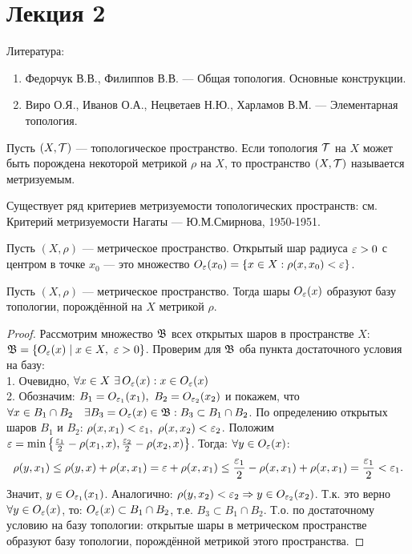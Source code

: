 \section{Лекция 2}

Литература:
\begin{enumerate}
    \item Федорчук В.В., Филиппов В.В. --- Общая топология. Основные конструкции.
    \item Виро О.Я., Иванов О.А., Нецветаев Н.Ю., Харламов В.М. --- Элементарная топология.
\end{enumerate}

\begin{definition}
    Пусть $(X, \mathcal{T})$ --- топологическое пространство. Если топология $\mathcal{T}$ на $X$ может быть порождена некоторой метрикой $\rho$ на $X$, то пространство $(X, \mathcal{T})$ называется метризуемым.
\end{definition}

\begin{nota_bene}
    Существует ряд критериев метризуемости топологических пространств: см. Критерий метризуемости Нагаты --- Ю.М.Смирнова, 1950-1951.
\end{nota_bene}

\begin{definition}
    Пусть $(X, \rho)$ --- метрическое пространство. Открытый шар радиуса $\varepsilon > 0$ с центром в точке $x_0$ --- это множество $O_{\varepsilon}(x_0) = \left\{x \in X : \rho(x, x_0) < \varepsilon\right\}$.
\end{definition}

\begin{theorem}
    Пусть $(X, \rho)$ --- метрическое пространство. Тогда шары $O_{\varepsilon}(x)$ образуют базу топологии, порождённой на $X$ метрикой $\rho$.
\end{theorem}
\begin{proof}
    Рассмотрим множество $\mathfrak{B}$ всех открытых шаров в пространстве $X$: \quad $\mfB = \cbr{O_{\veps}(x) \mid x \in X, \ \veps > 0}$. Проверим для $\mathfrak{B}$ оба пункта достаточного условия на базу: \\
    1. Очевидно, $\forall x \in X \ \exists \, O_{\varepsilon}(x) : x \in O_{\varepsilon}(x)$ \\
    2. Обозначим: $B_1 = O_{\varepsilon_1}(x_1), \ B_2 = O_{\varepsilon_2}(x_2)$ и покажем, что $\forall x \in B_1 \cap B_2 \quad \exists B_3 = O_{\varepsilon}(x) \in \mathfrak{B}: B_3 \subset B_1 \cap B_2$. По определению открытых шаров $B_1$ и $B_2$:
    $\rho(x, x_1) < \varepsilon_1, \ \rho(x, x_2) < \varepsilon_2$. Положим $\varepsilon = \min\left\{\frac{\varepsilon_1}{2} - \rho(x_1, x), \frac{\varepsilon_2}{2} - \rho(x_2, x)\right\}$. Тогда: $\forall y \in O_{\varepsilon}(x)$:
    \[
        \rho(y, x_1) \leq \rho(y, x) + \rho(x, x_1) = \varepsilon + \rho(x, x_1) \leq \frac{\varepsilon_1}{2} - \rho(x, x_1) + \rho(x, x_1) = \frac{\varepsilon_1}{2} < \varepsilon_1.
    \]
    Значит, $y \in O_{\varepsilon_1}(x_1)$. Аналогично: $\rho(y, x_2) < \varepsilon_2 \Rightarrow y \in O_{\varepsilon_2}(x_2)$. Т.к. это верно $\forall y \in O_{\varepsilon}(x)$, то: $O_{\varepsilon}(x) \subset B_1 \cap B_2$, т.е. $B_3 \subset B_1 \cap B_2$.
    Т.о. по достаточному условию на базу топологии: открытые шары в метрическом пространстве образуют базу топологии, порождённой метрикой этого пространства.
\end{proof}

